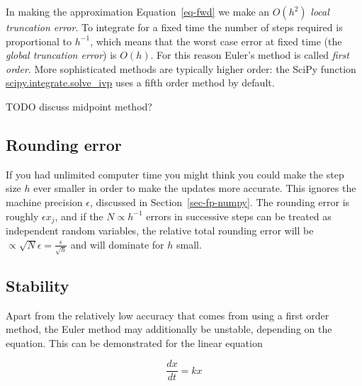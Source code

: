\documentclass[
  letterpaper,
  DIV=11,
  numbers=noendperiod]{scrreprt}
\theoremstyle{definition}
\theoremstyle{remark}
\begin{document}
In making the approximation Equation~\ref{eq-fwd} we make an \(O(h^2)\)
\emph{local truncation error}. To integrate for a fixed time the number
of steps required is proportional to \(h^{-1}\), which means that the
worst case error at fixed time (the \emph{global truncation error}) is
\(O(h)\). For this reason Euler's method is called \emph{first order}.
More sophisticated methods are typically higher order: the SciPy
function
\href{https://docs.scipy.org/doc/scipy/reference/generated/scipy.integrate.solve_ivp.html\#r179348322575-1}{scipy.integrate.solve\_ivp}
uses a fifth order method by default.

TODO discuss midpoint method?

\hypertarget{rounding-error}{%
\subsection{Rounding error}\label{rounding-error}}

If you had unlimited computer time you might think you could make the
step size \(h\) ever smaller in order to make the updates more accurate.
This ignores the machine precision \(\epsilon\), discussed in
Section~\ref{sec-fp-numpy}. The rounding error is roughly
\(\epsilon x_j\), and if the \(N\propto h^{-1}\) errors in successive
steps can be treated as independent random variables, the relative total
rounding error will be
\(\propto \sqrt{N}\epsilon=\frac{\epsilon}{\sqrt{h}}\) and will dominate
for \(h\) small.

\hypertarget{stability}{%
\subsection{Stability}\label{stability}}

Apart from the relatively low accuracy that comes from using a first
order method, the Euler method may additionally be unstable, depending
on the equation. This can be demonstrated for the linear equation

\[
\frac{dx}{dt} = kx
\]
\end{document}
